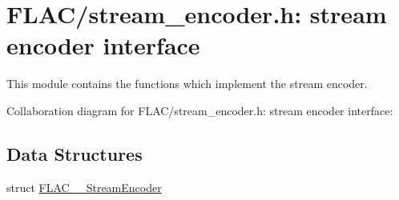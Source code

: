 \hypertarget{group__flac__stream__encoder}{}\section{F\+L\+A\+C/stream\+\_\+encoder.h\+: stream encoder interface}
\label{group__flac__stream__encoder}


This module contains the functions which implement the stream encoder.  


Collaboration diagram for F\+L\+A\+C/stream\+\_\+encoder.h\+: stream encoder interface\+:
\subsection*{Data Structures}
\begin{DoxyCompactItemize}
\item 
struct \hyperlink{struct_f_l_a_c_____stream_encoder}{F\+L\+A\+C\+\_\+\+\_\+\+Stream\+Encoder}
\end{DoxyCompactItemize}
